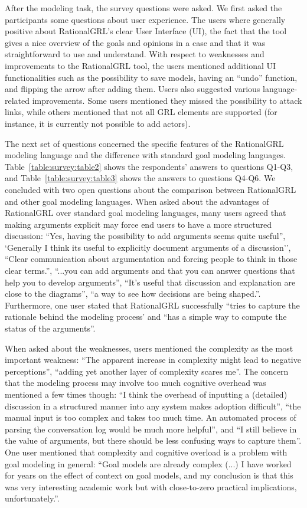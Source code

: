 After the modeling task, the survey questions were asked. We first asked the participants some questions about user experience. The users where generally positive about RationalGRL's clear User Interface (UI), the fact that the tool gives a nice overview of the goals and opinions in a case and that it was straightforward to use and understand. With respect to weaknesses and improvements to the RationalGRL tool, the users mentioned additional UI functionalities such as the possibility to save models, having an ``undo'' function, and flipping the arrow after adding them. Users also suggested various language-related improvements. Some users mentioned they missed the possibility to attack links, while others mentioned that not all GRL elements are supported (for instance, it is currently not possible to add actors). 

The next set of questions concerned the specific features of the RationalGRL modeling language and the difference with standard goal modeling languages. Table~\ref{table:survey:table2} shows the respondents' answers to questions Q1-Q3, and Table~\ref{table:survey:table3} shows the answers to questions Q4-Q6. We concluded with two open questions about the comparison between RationalGRL and other goal modeling languages. When asked about the advantages of RationalGRL over standard goal modeling languages, many users agreed that making arguments explicit may force end users to have a more structured discussion:  ``Yes, having the possibility to add arguments seems quite useful'', `Generally I think its useful to explicitly document arguments of a discussion'', ``Clear communication about argumentation and forcing people to think in those clear terms.'', ``...you can add arguments and that you can answer questions that help you to develop arguments'', ``It's useful that discussion and explanation are close to the diagrams'', ``a way to see how decisions are being shaped.''. Furthermore, one user stated that RationalGRL successfully ``tries to capture the rationale behind the modeling process' and ``has a simple way to compute the status of the arguments''. 

When asked about the weaknesses, users mentioned the complexity as the most important weakness: ``The apparent increase in complexity might lead to negative perceptions'', ``adding yet another layer of complexity scares me''. The concern that the modeling process may involve too much cognitive overhead was mentioned a few times though: ``I think the overhead of inputting a (detailed) discussion in a structured manner into any system makes adoption difficult'', ``the manual input is too complex and takes too much time. An automated process of parsing the conversation log would be much more helpful'', and ``I still believe in the value of arguments, but there should be less confusing ways to capture them''. One user mentioned that complexity and cognitive overload is a problem with goal modeling in general: ``Goal models are already complex (...) I have worked for years on the effect of context on goal models, and my conclusion is that this was very interesting academic work but with close-to-zero practical implications, unfortunately.''.

